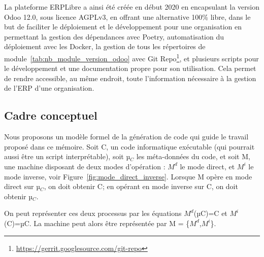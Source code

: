 La plateforme ERPLibre a ainsi été créée en début 2020 en encapsulant la version Odoo 12.0, sous licence AGPLv3, en offrant une alternative 100\% libre, dans le but de faciliter le déploiement et le développement pour une organisation en permettant la gestion des dépendances avec Poetry, automatisation du déploiement avec les Docker, la gestion de tous les répertoires de module~\ref{tab:nb_module_version_odoo} avec Git Repo\footnote{\url{https://gerrit.googlesource.com/git-repo}}, et plusieurs scripts pour le développement et une documentation propre pour son utilisation. Cela permet de rendre accessible, au même endroit, toute l'information nécessaire à la gestion de l'ERP d'une organisation.





\subsection{Cadre conceptuel} \label{subsection_cadre_conceptuel}

Nous proposons un modèle formel de la génération de code qui guide le travail proposé dans ce mémoire. Soit C, un code informatique exécutable (qui pourrait aussi être un script interprétable), soit µ$_C$ les méta-données du code, et soit M, une machine disposant de deux modes d’opération : $M^d$ le mode direct, et $M^i$ le mode inverse, voir Figure~\ref{fig:mode_direct_inverse}. Lorsque M opère en mode direct sur µ$_C$, on doit obtenir C; en opérant en mode inverse sur C, on doit obtenir µ$_C$.

On peut représenter ces deux processus par les équations $M^d$(µC)=C et $M^i$(C)=µC. La machine peut alors être représentée par M = \{$M^d$,$M^i$\}.

